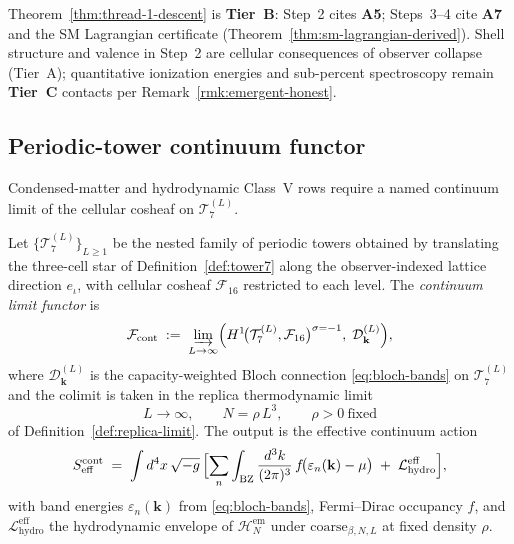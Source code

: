 \begin{remark}
Theorem~\ref{thm:thread-1-descent} is \textbf{Tier~B}: Step~2 cites
\textbf{A5}; Steps~3--4 cite \textbf{A7} and the SM Lagrangian certificate
(Theorem~\ref{thm:sm-lagrangian-derived}). Shell structure and valence in
Step~2 are cellular consequences of observer collapse (Tier~A); quantitative
ionization energies and sub-percent spectroscopy remain \textbf{Tier~C}
contacts per Remark~\ref{rmk:emergent-honest}.
\end{remark}

\subsection{Periodic-tower continuum functor}
\label{sec:wave2-thread1:continuum}

Condensed-matter and hydrodynamic Class~V rows require a named continuum limit
of the cellular cosheaf on $\mathcal{T}_7^{(L)}$.

\begin{definition}\label{def:thread-1-continuum}
Let $\{\mathcal{T}_7^{(L)}\}_{L\ge 1}$ be the nested family of periodic towers
obtained by translating the three-cell star of Definition~\ref{def:tower7}
along the observer-indexed lattice direction $e_\iota$, with cellular cosheaf
$\mathcal{F}_{16}$ restricted to each level. The \emph{continuum limit
functor} is
\begin{equation}\label{eq:thread1-continuum}
  \mathcal{F}_{\mathrm{cont}}
  \;:=\;
  \varinjlim_{L\to\infty}
  \Bigl(
    H^1\!\bigl(\mathcal{T}_7^{(L)},\mathcal{F}_{16}\bigr)^{\sigma=-1},
    \;\mathcal{D}_{\mathbf{k}}^{(L)}
  \Bigr),
\end{equation}
where $\mathcal{D}_{\mathbf{k}}^{(L)}$ is the capacity-weighted Bloch
connection \eqref{eq:bloch-bands} on $\mathcal{T}_7^{(L)}$ and the colimit is
taken in the replica thermodynamic limit
\begin{equation}\label{eq:thread1-replica}
  L\to\infty,
  \qquad
  N=\rho\,L^3,
  \qquad
  \rho>0\ \text{fixed}
\end{equation}
of Definition~\ref{def:replica-limit}. The output is the effective continuum
action
\begin{equation}\label{eq:thread1-cont-action}
  S_{\mathrm{eff}}^{\mathrm{cont}}
  \;=\;
  \int d^4x\,\sqrt{-g}\,
  \Bigl[
    \sum_n\int_{\mathrm{BZ}}\frac{d^3k}{(2\pi)^3}\,
    f\!\bigl(\varepsilon_n(\mathbf{k})-\mu\bigr)
    \;+\;
    \mathcal{L}_{\mathrm{hydro}}^{\mathrm{eff}}
  \Bigr],
\end{equation}
with band energies $\varepsilon_n(\mathbf{k})$ from \eqref{eq:bloch-bands},
Fermi--Dirac occupancy $f$, and $\mathcal{L}_{\mathrm{hydro}}^{\mathrm{eff}}$
the hydrodynamic envelope of $\mathcal{H}_N^{\mathrm{em}}$ under
$\mathrm{coarse}_{\beta,N,L}$ at fixed density $\rho$.
\end{definition}

